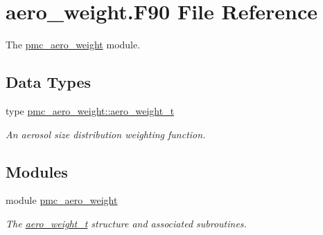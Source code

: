 \hypertarget{aero__weight_8_f90}{}\section{aero\+\_\+weight.\+F90 File Reference}
\label{aero__weight_8_f90}


The \mbox{\hyperlink{namespacepmc__aero__weight}{pmc\+\_\+aero\+\_\+weight}} module.  


\subsection*{Data Types}
\begin{DoxyCompactItemize}
\item 
type \mbox{\hyperlink{structpmc__aero__weight_1_1aero__weight__t}{pmc\+\_\+aero\+\_\+weight\+::aero\+\_\+weight\+\_\+t}}
\begin{DoxyCompactList}\small\item\em An aerosol size distribution weighting function. \end{DoxyCompactList}\end{DoxyCompactItemize}
\subsection*{Modules}
\begin{DoxyCompactItemize}
\item 
module \mbox{\hyperlink{namespacepmc__aero__weight}{pmc\+\_\+aero\+\_\+weight}}
\begin{DoxyCompactList}\small\item\em The \mbox{\hyperlink{structpmc__aero__weight_1_1aero__weight__t}{aero\+\_\+weight\+\_\+t}} structure and associated subroutines. \end{DoxyCompactList}\end{DoxyCompactItemize}
